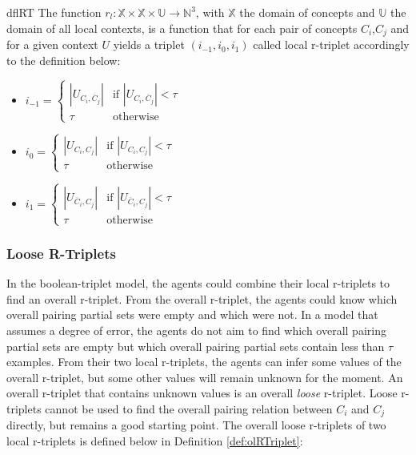 \begin{restatable}{df}{lRT}
\label{def:lRTriplet}
The function $r_{l}: \mathbb{X} \times \mathbb{X} \times \mathbb{U} \rightarrow  \mathbb{N}^{3}$, with $\mathbb{X}$ the domain of concepts and $\mathbb{U}$ the domain of all local contexts, is a function that for each pair of concepts $C_{i}$,$C_{j}$ and for a given context $U$ yields a triplet $(i_{-1},i_{0},i_{1})$ called local r-triplet accordingly to the definition below:

\begin{itemize}
\item $i_{-1} = \left\{
	\begin{array}{ll}
		|U_{C_i,\overbar{C}_j}|  & \mbox{if } |U_{C_i,\overbar{C}_j}| < \tau \\
		\tau & \mbox{otherwise}
	\end{array}
\right.$
\item $i_{0} = \left\{
	\begin{array}{ll}
		|U_{C_i,C_j}|  & \mbox{if } |U_{C_i,C_j}| < \tau \\
		\tau & \mbox{otherwise}
	\end{array}
\right.$
\item $i_{1} = \left\{
	\begin{array}{ll}
		|U_{\overbar{C}_i,C_j}|  & \mbox{if } |U_{\overbar{C}_i,C_j}| < \tau \\
		\tau & \mbox{otherwise}
	\end{array}
\right.$
\end{itemize}
\end{restatable}

\subsubsection{Loose R-Triplets}

In the boolean-triplet model, the agents could combine their local r-triplets to find an overall r-triplet. From the overall r-triplet, the agents could know which overall pairing partial sets were empty and which were not. In a model that assumes a degree of error, the agents do not aim to find which overall pairing partial sets are empty but which overall pairing partial sets contain less than $\tau$ examples. From their two local r-triplets, the agents can infer some values of the overall r-triplet, but some other values will remain unknown for the moment. An overall r-triplet that contains unknown values is an overall \emph{loose} r-triplet. Loose r-triplets cannot be used to find the overall pairing relation between $C_{i}$ and $C_{j}$ directly, but remains a good starting point. The overall loose r-triplets of two local r-triplets is defined below in Definition \ref{def:olRTriplet}:

